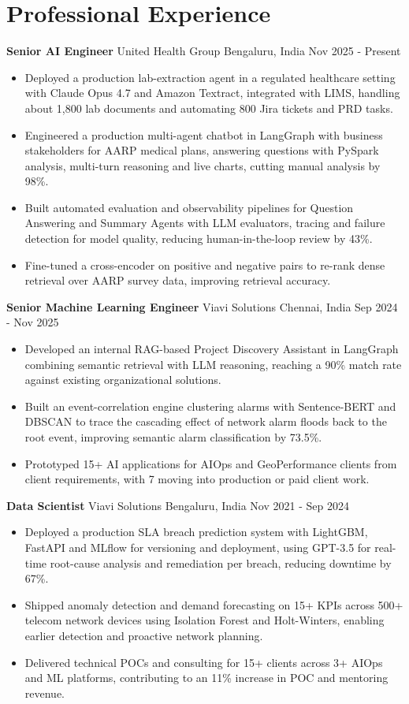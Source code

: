 \documentclass[10pt,a4paper]{article}
\newcommand{\role}[4]{\textbf{#1} \textbar{} #2 \hfill #3 \textbar{} #4\par}
\begin{document}
\section{Professional Experience}
\role{Senior AI Engineer}{United Health Group}{Bengaluru, India}{Nov 2025 - Present}
\begin{itemize}
  \item Deployed a production lab-extraction agent in a regulated healthcare setting with Claude Opus 4.7 and Amazon Textract, integrated with LIMS, handling about 1,800 lab documents and automating 800 Jira tickets and PRD tasks.
  \item Engineered a production multi-agent chatbot in LangGraph with business stakeholders for AARP medical plans, answering questions with PySpark analysis, multi-turn reasoning and live charts, cutting manual analysis by 98\%.
  \item Built automated evaluation and observability pipelines for Question Answering and Summary Agents with LLM evaluators, tracing and failure detection for model quality, reducing human-in-the-loop review by 43\%.
  \item Fine-tuned a cross-encoder on positive and negative pairs to re-rank dense retrieval over AARP survey data, improving retrieval accuracy.
\end{itemize}
\vspace{3pt}
\role{Senior Machine Learning Engineer}{Viavi Solutions}{Chennai, India}{Sep 2024 - Nov 2025}
\begin{itemize}
  \item Developed an internal RAG-based Project Discovery Assistant in LangGraph combining semantic retrieval with LLM reasoning, reaching a 90\% match rate against existing organizational solutions.
  \item Built an event-correlation engine clustering alarms with Sentence-BERT and DBSCAN to trace the cascading effect of network alarm floods back to the root event, improving semantic alarm classification by 73.5\%.
  \item Prototyped 15+ AI applications for AIOps and GeoPerformance clients from client requirements, with 7 moving into production or paid client work.
\end{itemize}
\vspace{3pt}
\role{Data Scientist}{Viavi Solutions}{Bengaluru, India}{Nov 2021 - Sep 2024}
\begin{itemize}
  \item Deployed a production SLA breach prediction system with LightGBM, FastAPI and MLflow for versioning and deployment, using GPT-3.5 for real-time root-cause analysis and remediation per breach, reducing downtime by 67\%.
  \item Shipped anomaly detection and demand forecasting on 15+ KPIs across 500+ telecom network devices using Isolation Forest and Holt-Winters, enabling earlier detection and proactive network planning.
  \item Delivered technical POCs and consulting for 15+ clients across 3+ AIOps and ML platforms, contributing to an 11\% increase in POC and mentoring revenue.
\end{itemize}
\end{document}
